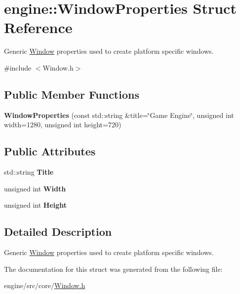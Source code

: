 \hypertarget{structengine_1_1WindowProperties}{}\section{engine\+:\+:Window\+Properties Struct Reference}
\label{structengine_1_1WindowProperties}


Generic \hyperlink{classengine_1_1Window}{Window} properties used to create platform specific windows.  




{\ttfamily \#include $<$Window.\+h$>$}

\subsection*{Public Member Functions}
\begin{DoxyCompactItemize}
\item 
\mbox{\label{structengine_1_1WindowProperties_a8987e75ecc92e10f6764c0a677839b71}} 
{\bfseries Window\+Properties} (const std\+::string \&title=\char`\"{}Game Engine\char`\"{}, unsigned int width=1280, unsigned int height=720)
\end{DoxyCompactItemize}
\subsection*{Public Attributes}
\begin{DoxyCompactItemize}
\item 
\mbox{\label{structengine_1_1WindowProperties_a900cb8f590d355b520c7f8f4f75ecd99}} 
std\+::string {\bfseries Title}
\item 
\mbox{\label{structengine_1_1WindowProperties_a565d00a868bd2aae0abedb9e0f6faf9e}} 
unsigned int {\bfseries Width}
\item 
\mbox{\label{structengine_1_1WindowProperties_aa88ea216a94e459a14c5e8549c9630ba}} 
unsigned int {\bfseries Height}
\end{DoxyCompactItemize}


\subsection{Detailed Description}
Generic \hyperlink{classengine_1_1Window}{Window} properties used to create platform specific windows. 

The documentation for this struct was generated from the following file\+:\begin{DoxyCompactItemize}
\item 
engine/src/core/\hyperlink{core_2Window_8h}{Window.\+h}\end{DoxyCompactItemize}
